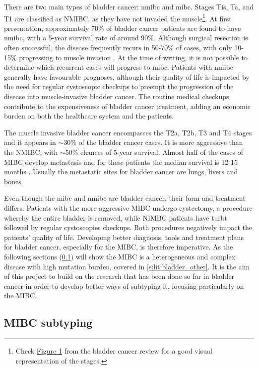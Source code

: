 There are two main types of bladder cancer: \acrfull{nmibc} and \acrfull{mibc}. Stages Tis, Ta, and T1 are classified as NMIBC, as they have not invaded the muscle\footnote{Check \href{https://www.nature.com/articles/nrc3817/figures/1}{Figure 1} from the bladder cancer review \citep{Knowles2015-mu} for a good visual representation of the stages.}. At first presentation, approximately 70\% of bladder cancer patients are found to have \acrshort{nmibc}, with a 5-year survival rate of around 90\%. Although surgical resection is often successful, the disease frequently recurs in 50-70\% of cases, with only 10-15\% progressing to muscle invasion \citep{Knowles2015-mu}. At the time of writing, it is not possible to determine which recurrent cases will progress to \acrshort{mibc}. Patients with \acrshort{nmibc} generally have favourable prognoses, although their quality of life is impacted by the need for regular cystoscopic checkups to preempt the progression of the disease into muscle-invasive bladder cancer. The routine medical checkups contribute to the expensiveness of bladder cancer treatment, adding an economic burden on both the healthcare system and the patients.

The muscle invasive bladder cancer encompasses the T2a, T2b, T3 and T4 stages and it appears in $\sim$30\% of the bladder cancer cases. It is more aggressive than the NMIBC, with $\sim$50\% chances of 5-year survival. Almost half of the cases of MIBC develop metastasis and for these patients the median survival is 12-15 months \citep{Knowles2015-mu}. Usually the metastatic sites for bladder cancer are lungs, livers and bones.

Even though the \acrshort{mibc} and \acrshort{nmibc} are bladder cancer, their form and treatment differs. Patients with the more aggressive MIBC undergo cystectomy, a procedure whereby the entire bladder is removed, while NIMBC patients have \acrfull{turbt} followed by regular cystoscopies checkups. Both procedures negatively impact the patients' quality of life. Developing better diagnosis, tools and treatment plans for bladder cancer, especially for the MIBC, is therefore imperative. As the following sections (\cref{s:lit:subtypes_mibc}) will show the MIBC is a heterogeneous and complex disease with high mutation burden, covered in \cref{s:lit:bladder_other}. It is the aim of this project to build on the research that has been done so far in bladder cancer in order to develop better ways of subtyping it, focusing particularly on the MIBC.

\subsection{MIBC subtyping} \label{s:lit:subtypes_mibc}

